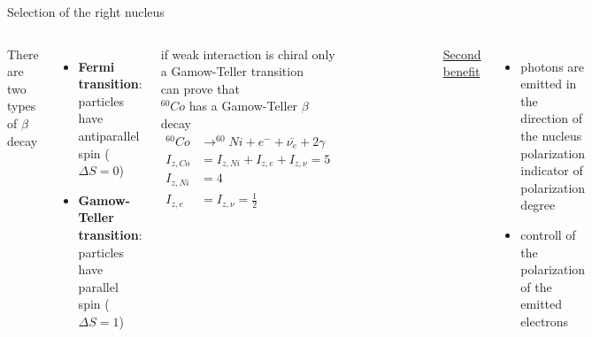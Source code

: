 \documentclass[aspectratio=1610, 10pt]{beamer}
\begin{document}
\begin{frame}{Selection of the right nucleus}
	\begin{columns}
		There are two types of $\beta$ decay
		\begin{itemize}
			\item \textbf{Fermi transition}: particles have antiparallel spin ($\Delta  S = 0$)
			\item \textbf{Gamow-Teller transition}: particles have parallel spin ($\Delta S = 1$)
		\end{itemize}
		\textrightarrow if weak interaction is chiral only a Gamow-Teller transition\\
		 can prove that\\
		\textrightarrow $^{60}Co$ has a Gamow-Teller $\beta$ decay\\
		\begin{align*}
			^{60}Co &\rightarrow ^{60}Ni + e^- + \bar{\nu_{e}} + 2\gamma\\
			I_{z,Co} &= I_{z,Ni} + I_{z,e} + I_{z,\nu} = 5 \\
			I_{z,Ni} &= 4\\
			I_{z,e} &= I_{z,\nu} = \frac{1}{2}
		\end{align*}
		\begin{figure}
			\includegraphics[width=0.85\textwidth]{images/Co_beta.png}
		\end{figure}
		\underline{Second benefit}
		\begin{itemize}
			\item photons are emitted in the direction of the nucleus polarization\\
			\textrightarrow indicator of polarization degree
			\item controll of the polarization of the emitted electrons
		\end{itemize}
	\end{columns}
\end{frame}
\end{document}

